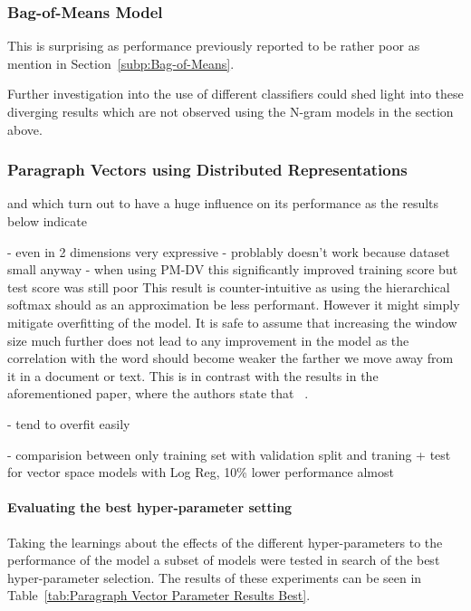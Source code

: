 \subsubsection{Bag-of-Means Model}

This is surprising as performance previously reported to be rather poor as mention in Section~\ref{subp:Bag-of-Means}.

 Further investigation into the use of different classifiers could shed light into these diverging results which are not observed using the N-gram models in the section above.

\subsubsection{Paragraph Vectors using Distributed Representations}

and which turn out to have a huge influence on its performance as the results below indicate

- even in 2 dimensions very expressive
- problably doesn't work because dataset small anyway
- when using PM-DV this significantly improved training score but test score was still poor
This result is counter-intuitive as using the hierarchical softmax should as an approximation be less performant. However it might simply mitigate overfitting of the model.
It is safe to assume that increasing the window size much further does not lead to any improvement in the model as the correlation with the word should become weaker the farther we move away from it in a document or text.
This is in contrast with the results in the aforementioned paper, where the authors state that ~\cite{Le:2014aa}.

- tend to overfit easily


- comparision between only training set with validation split and traning + test for vector space models with Log Reg, 10\% lower performance almost


\paragraph{Evaluating the best hyper-parameter setting}

Taking the learnings about the effects of the different hyper-parameters to the performance of the model a subset of models were tested in search of the best hyper-parameter selection. The results of these experiments can be seen in Table~\ref{tab:Paragraph Vector Parameter Results Best}.

